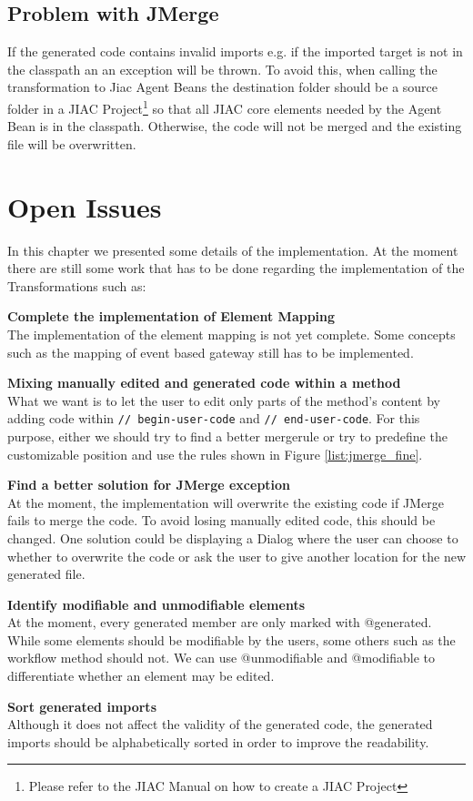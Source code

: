 \subsection{Problem with JMerge}
If the generated code contains invalid imports e.g. if the imported target is not in the classpath an an exception will be thrown. 
To avoid this, when calling the transformation to Jiac Agent Beans the destination folder should be a source folder in a JIAC Project\footnote{Please refer to the JIAC Manual\cite{JIACMAN10} on how to create a JIAC Project} so that all JIAC core elements needed by the Agent Bean is in the classpath. Otherwise, the code will not be merged and the existing file will be overwritten. 
\section{Open Issues}
\label{sec:opi}
In this chapter we presented some details of the implementation. At the moment there are still some work that has to be done regarding the implementation of the Transformations such as:

\textbf{Complete the implementation of Element Mapping }\\
The implementation of the element mapping is not yet complete. Some concepts such as the mapping of event based gateway still has to be implemented. 

\textbf{Mixing manually edited and generated code within a method}\\
What we want is to let the user to edit only parts of the method's content by adding code within \verb|// begin-user-code| and \verb|// end-user-code|. For this purpose, either we should try to find a better mergerule or try to predefine the customizable position and use the rules shown in Figure \ref{list:jmerge_fine}.

\textbf{Find a better solution for JMerge exception}\\
At the moment, the implementation will overwrite the existing code if JMerge fails to merge the code. To avoid losing manually edited code, this should be changed. One solution could be displaying a Dialog where the user can choose to whether to overwrite the code or ask the user to give another location for the new generated file. 

\textbf{Identify modifiable and unmodifiable elements}\\
At the moment, every generated member are only marked with @generated. While some elements should be modifiable by the users, some others such as the workflow method should not. We can use @unmodifiable and @modifiable to differentiate whether an element may be edited. 

\textbf{Sort generated imports}\\
Although it does not affect the validity of the generated code, the generated imports should be alphabetically sorted in order to improve the readability.




